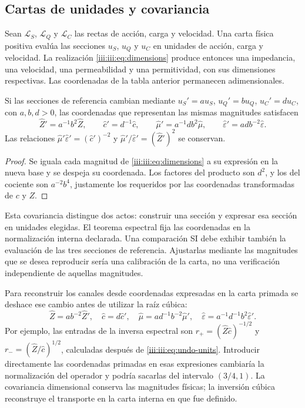 \subsection{Cartas de unidades y covariancia}

Sean $\mathcal L_S$, $\mathcal L_Q$ y $\mathcal L_C$ las rectas de
acción, carga y velocidad. Una carta física positiva evalúa las secciones
$u_S$, $u_Q$ y $u_C$ en unidades de acción, carga y velocidad. La realización
\eqref{iii:iii:eq:dimensions} produce entonces una impedancia, una velocidad,
una permeabilidad y una permitividad, con sus dimensiones respectivas.
Las coordenadas de la tabla anterior permanecen adimensionales.

\begin{proposition}
Si las secciones de referencia cambian mediante
$u_S'=a u_S$, $u_Q'=b u_Q$, $u_C'=d u_C$, con $a,b,d>0$, las
coordenadas que representan las mismas magnitudes satisfacen
\[
 \widehat Z'=a^{-1}b^2\widehat Z,\qquad
 \widehat c'=d^{-1}\widehat c,\qquad
 \widehat\mu'=a^{-1}db^2\widehat\mu,\qquad
 \widehat\varepsilon'=adb^{-2}\widehat\varepsilon.
\]
Las relaciones $\widehat\mu'\widehat\varepsilon'=(\widehat c')^{-2}$
y $\widehat\mu'/\widehat\varepsilon'=(\widehat Z')^2$ se conservan.
\end{proposition}
\begin{proof}
Se iguala cada magnitud de \eqref{iii:iii:eq:dimensions} a su expresión
en la nueva base y se despeja su coordenada. Los factores del producto
son $d^2$, y los del cociente son $a^{-2}b^4$, justamente los requeridos
por las coordenadas transformadas de $c$ y $Z$.
\end{proof}

Esta covariancia distingue dos actos: construir una sección y expresar
esa sección en unidades elegidas. El teorema espectral fija las coordenadas
en la normalización interna declarada. Una comparación SI debe exhibir
también la evaluación de las tres secciones de referencia. Ajustarlas
mediante las magnitudes que se desea reproducir sería una calibración de
la carta, no una verificación independiente de aquellas magnitudes.

Para reconstruir los canales desde coordenadas expresadas en la carta
primada se deshace ese cambio antes de utilizar la raíz cúbica:
\begin{equation}
 \widehat Z=ab^{-2}\widehat Z',\quad
 \widehat c=d\widehat c',\quad
 \widehat\mu=ad^{-1}b^{-2}\widehat\mu',\quad
 \widehat\varepsilon=a^{-1}d^{-1}b^2\widehat\varepsilon'.
 \label{iii:iii:eq:undo-units}
\end{equation}
Por ejemplo, las entradas de la inversa espectral son
$r_+=(\widehat Z\widehat c)^{-1/2}$ y
$r_-=(\widehat Z/\widehat c)^{1/2}$, calculadas después de
\eqref{iii:iii:eq:undo-units}. Introducir directamente las coordenadas primadas
en esas expresiones cambiaría la normalización del operador y podría
sacarlas del intervalo $(3/4,1)$. La covariancia dimensional conserva
las magnitudes físicas; la inversión cúbica reconstruye el transporte
en la carta interna en que fue definido.

